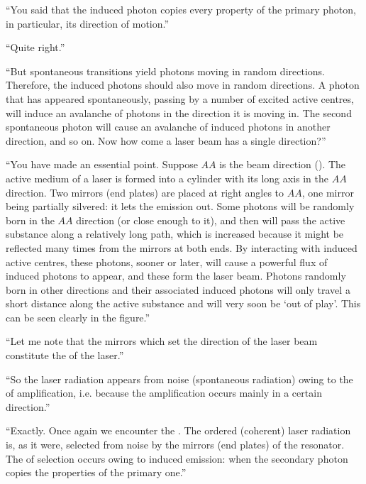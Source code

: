 \begin{dialogue}

\rdr ``You said that the induced photon copies every property of
the primary photon, in particular, its direction of motion.''

\athr ``Quite right.''

\rdr ``But spontaneous transitions yield photons moving in
random directions. Therefore, the induced photons should also move
in random directions. A photon that has appeared spontaneously,
passing by a number of excited active centres, will induce an
avalanche of photons in the direction it is moving in. The second
spontaneous photon will cause an avalanche of induced photons in
another direction, and so on. Now how come a laser beam has
a single direction?''

\athr ``You have made an essential point. Suppose $AA$ is the beam
direction (). The active medium of a laser is formed into a cylinder with its long axis in the $AA$ direction. Two mirrors (end plates) are placed at right angles to $AA$, one mirror being partially
silvered: it lets the emission out. Some photons will be randomly born
in the $AA$ direction (or close enough to it), and then will pass the
active substance along a relatively long path, which is increased
because it might be reflected many times from the mirrors at both
ends. By interacting with induced active centres, these photons, sooner
or later, will cause a powerful flux of induced photons to appear, and
these form the laser beam. Photons randomly born in other directions
and their associated induced photons will only travel a short distance
along the active substance and will very soon be `out of play'. This
can be seen clearly in the figure.''

``Let me note that the mirrors which set the direction of the laser
beam constitute the  of the laser.''

\rdr ``So the laser radiation appears from noise (spontaneous
radiation) owing to the  of amplification, i.e. because the
amplification occurs mainly in a certain direction.''

\athr ``Exactly. Once again we encounter the . The ordered (coherent) laser radiation is, as it
were, selected from noise by the mirrors (end plates) of the resonator.
The  of selection occurs owing to induced emission: when the secondary photon copies the properties of the primary one.''


\end{dialogue}


